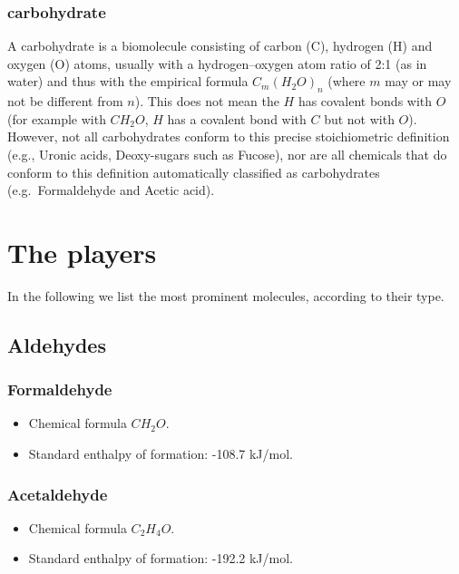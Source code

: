 \documentclass[a4paper,14pt]{extarticle}
\begin{document}
\subsubsection{carbohydrate}
A carbohydrate is a biomolecule consisting of carbon (C), hydrogen (H) and oxygen (O)
atoms, usually with a hydrogen–oxygen atom ratio of 2:1 (as in water) and thus with the
empirical formula $C_m{(H_2O)}_n$ (where $m$ may or may not be different from $n$). This
does not mean the $H$ has covalent bonds with $O$ (for example with $CH_2O$, $H$ has a
covalent bond with $C$ but not with $O$). However, not all carbohydrates conform to this
precise stoichiometric definition (e.g., Uronic acids, Deoxy-sugars such as Fucose), nor
are all chemicals that do conform to this definition automatically classified as
carbohydrates (e.g.\ Formaldehyde and Acetic acid).


\pagebreak
\section{The players}\label{sec_players}
In the following we list the most prominent molecules, according to their type.

\subsection{Aldehydes}

\subsubsection{Formaldehyde}

\begin{itemize}
    \item Chemical formula $CH_2O$.
    \item Standard enthalpy of formation: -108.7 kJ/mol.
\end{itemize}

\subsubsection{Acetaldehyde}

\begin{itemize}
    \item Chemical formula $C_2H_4O$.
    \item Standard enthalpy of formation: -192.2 kJ/mol.
\end{itemize}
\end{document}
